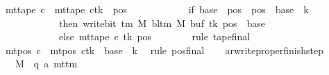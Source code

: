 \begin{isabellebody}
\ {\isachardoublequoteopen}mt{\isacharunderscore}{\kern0pt}tape\ c{}\ {\isacharequal}{\kern0pt}\ {\isacharparenleft}{\kern0pt}mt{\isacharunderscore}{\kern0pt}tape\ c{\isacharprime}{\kern0pt}{\isacharparenright}{\kern0pt}{\isacharparenleft}{\kern0pt}tk\ {\isacharcolon}{\kern0pt}{\isacharequal}{\kern0pt}\ {\isacharparenleft}{\kern0pt}{\isasymlambda}pos{\isachardot}{\kern0pt}\isanewline
\ \ \ \ \ \ \ \ \ \ \ \ if\ base\ {\isasymle}\ pos\ {\isasymand}\ pos\ {\isacharless}{\kern0pt}\ base\ {\isacharplus}{\kern0pt}\ {\isacharquery}{\kern0pt}k\isanewline
\ \ \ \ \ \ \ \ \ \ \ \ then\ write{\isacharunderscore}{\kern0pt}bit\ {\isacharparenleft}{\kern0pt}{\isasymGamma}{\isacharunderscore}{\kern0pt}tm\ M{\isacharparenright}{\kern0pt}\ {\isacharparenleft}{\kern0pt}bl{\isacharunderscore}{\kern0pt}tm\ M{\isacharparenright}{\kern0pt}\ {\isacharparenleft}{\kern0pt}buf\ tk{\isacharparenright}{\kern0pt}\ {\isacharparenleft}{\kern0pt}pos\ {\isacharminus}{\kern0pt}\ base{\isacharparenright}{\kern0pt}\isanewline
\ \ \ \ \ \ \ \ \ \ \ \ else\ mt{\isacharunderscore}{\kern0pt}tape\ c{\isacharprime}{\kern0pt}\ tk\ pos{\isacharparenright}{\kern0pt}{\isacharparenright}{\kern0pt}{\isachardoublequoteclose}\isanewline
\ \ \ \ \ \ \isamarkupfalse%
\ {\isacharparenleft}{\kern0pt}rule\ tape{\isacharunderscore}{\kern0pt}final{\isacharparenright}{\kern0pt}\isanewline
\ \ \ \ \isamarkupfalse%
\ {\isachardoublequoteopen}mt{\isacharunderscore}{\kern0pt}pos\ c{}\ {\isacharequal}{\kern0pt}\ {\isacharparenleft}{\kern0pt}mt{\isacharunderscore}{\kern0pt}pos\ c{\isacharprime}{\kern0pt}{\isacharparenright}{\kern0pt}{\isacharparenleft}{\kern0pt}tk\ {\isacharcolon}{\kern0pt}{\isacharequal}{\kern0pt}\ base\ {\isacharplus}{\kern0pt}\ {\isacharquery}{\kern0pt}k{\isacharparenright}{\kern0pt}{\isachardoublequoteclose}\ \isamarkupfalse%
\ {\isacharparenleft}{\kern0pt}rule\ pos{\isacharunderscore}{\kern0pt}final{\isacharparenright}{\kern0pt}\isanewline
\ \ \isamarkupfalse%
\isanewline
{}\isamarkupfalse%
%
\endisatagproof
{\isafoldproof}%
%
\isadelimproof
\isanewline
%
\endisadelimproof
\isanewline
{}\isamarkupfalse%
\ ar{\isacharunderscore}{\kern0pt}write{\isacharunderscore}{\kern0pt}proper{\isacharunderscore}{\kern0pt}finish{\isacharunderscore}{\kern0pt}step{\isacharcolon}{\kern0pt}\isanewline
\ \ \ M\ {\isacharcolon}{\kern0pt}{\isacharcolon}{\kern0pt}\ {\isachardoublequoteopen}{\isacharparenleft}{\kern0pt}{\isacharprime}{\kern0pt}q{\isacharcomma}{\kern0pt}\ {\isacharprime}{\kern0pt}a{\isacharparenright}{\kern0pt}\ mttm{\isachardoublequoteclose}\isanewline

\end{isabellebody}
